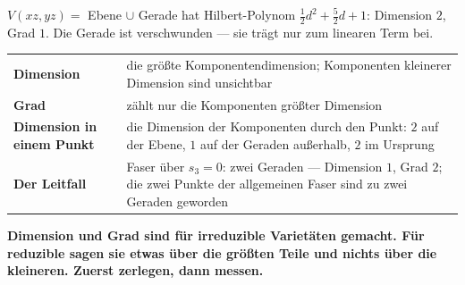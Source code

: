 \begin{warnung}
$V(xz, yz) = $ Ebene $\cup$ Gerade hat Hilbert-Polynom $\tfrac12d^{2} + \tfrac52d + 1$: Dimension $2$, Grad $1$. Die Gerade ist verschwunden --- sie trägt nur zum linearen Term bei.

\begin{center}
{\small
\renewcommand{\arraystretch}{1.5}
\begin{tabular}{@{}P{3.2cm}P{5.6cm}@{}}
\toprule
\textbf{Dimension} & die größte Komponentendimension; Komponenten kleinerer Dimension sind unsichtbar\\
\textbf{Grad} & zählt nur die Komponenten größter Dimension\\
\textbf{Dimension in einem Punkt} & die Dimension der Komponenten durch den Punkt: $2$ auf der Ebene, $1$ auf der Geraden außerhalb, $2$ im Ursprung\\
\textbf{Der Leitfall} & Faser über $s_3 = 0$: zwei Geraden --- Dimension $1$, Grad $2$; die zwei Punkte der allgemeinen Faser sind zu zwei Geraden geworden\\
\bottomrule
\end{tabular}}
\end{center}

\begin{center}
\begin{minipage}{0.9\textwidth}
\textbf{Dimension und Grad sind für irreduzible Varietäten gemacht. Für reduzible sagen sie etwas über die größten Teile und nichts über die kleineren. Zuerst zerlegen, dann messen.}
\end{minipage}
\end{center}

\begin{center}
\begin{minipage}{0.88\textwidth}
\end{minipage}
\end{center}
\end{warnung}

